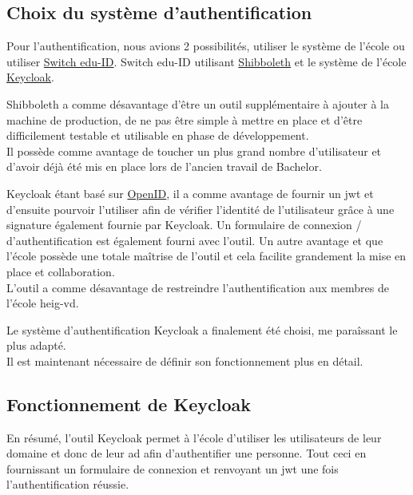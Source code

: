 \documentclass[
    iai, %
    il, %
]{heig-tb}
\begin{document}
\subsection{Choix du système d'authentification}
Pour l'authentification, nous avions 2 possibilités, utiliser le système de l'école ou utiliser \href{https://www.switch.ch/edu-id/}{Switch edu-ID}. Switch edu-ID utilisant \href{https://www.switch.ch/aai/about/shibboleth/}{Shibboleth} et le système de l'école \href{https://www.keycloak.org/}{Keycloak}.

Shibboleth a comme désavantage d'être un outil supplémentaire à ajouter à la machine de production, de ne pas être simple à mettre en place et d'être difficilement testable et utilisable en phase de développement. \\
Il possède comme avantage de toucher un plus grand nombre d'utilisateur et d'avoir déjà été mis en place lors de l'ancien travail de Bachelor.

Keycloak étant basé sur \href{https://openid.net/connect/}{OpenID}, il a comme avantage de fournir un \Gls{jwt} et d'ensuite pourvoir l'utiliser afin de vérifier l'identité de l'utilisateur grâce à une signature également fournie par Keycloak. Un formulaire de connexion / d'authentification est également fourni avec l'outil. Un autre avantage et que l'école possède une totale maîtrise de l'outil et cela facilite grandement la mise en place et collaboration. \\
L'outil a comme désavantage de restreindre l'authentification aux membres de l'école \Gls{heig-vd}.


Le système d'authentification Keycloak a finalement été choisi, me paraîssant le plus adapté. \\
Il est maintenant nécessaire de définir son fonctionnement plus en détail.

\subsection{Fonctionnement de Keycloak}
En résumé, l'outil Keycloak permet à l'école d'utiliser les utilisateurs de leur domaine et donc de leur \Gls{ad} afin d'authentifier une personne. Tout ceci en fournissant un formulaire de connexion et renvoyant un \Gls{jwt} une fois l'authentification réussie.
\end{document}
